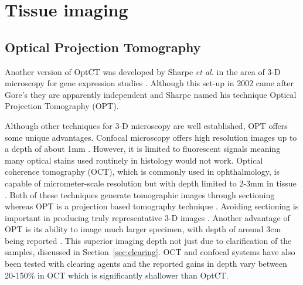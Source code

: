 
 









\section{Tissue imaging}
\label{sec:tissue}
\subsection{Optical Projection Tomography}
\label{subsec:OPT}
Another version of OptCT was  developed by Sharpe \textit{et al.} in the area of 3-D microscopy for gene expression studies \cite{Sharpe:2002jp}. Although this set-up in 2002 came after Gore's they are apparently independent and Sharpe named his technique Optical Projection Tomography (OPT).

Although other techniques for 3-D microscopy are well established, OPT offers some unique advantages. 
Confocal microscopy offers high resolution images up to a depth of about 1mm \cite{Webb:1996}. However, it is limited to fluorescent signals meaning many optical stains used routinely in histology would not work. Optical coherence tomography (OCT), which is commonly used in ophthalmology, is capable of micrometer-scale resolution but with  depth limited to 2-3mm in tissue \cite{huang1993optical}. Both of these techniques generate tomographic images through sectioning whereas OPT is a projection based tomography technique \cite{Sharpe:2003cm}. Avoiding sectioning is important in producing truly representative 3-D images \cite{Oldham:2007ku}. Another advantage of  OPT is its ability to  image much larger specimen, with depth of around 3cm being reported \cite{Oldham:2007ku}. This superior imaging depth not just due to clarification of the samples, discussed in Section~\ref{sec:clearing}. OCT and confocal systems have also been tested with clearing agents and the reported gains in depth vary between 20-150\% in OCT \cite{Tuchin:2002} which is significantly shallower than OptCT.


